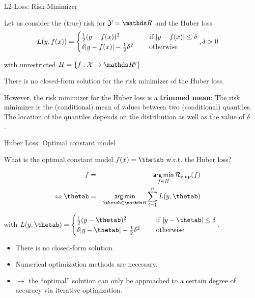 \begin{vbframe}{L2-Loss: Risk Minimizer}

Let us consider the (true) risk for  $\Yspace = \R$ and the Huber loss
$$
L(y, f(x)) = \begin{cases}
  \frac{1}{2}(y - f(x))^2  & \text{ if } |y - f(x)| \le \delta \\
  \delta |y - f(x)|-\frac{1}{2}\delta^2 \quad & \text{ otherwise }
  \end{cases}, \delta > 0
$$

 with unrestricted $\Hspace = \{f: \Xspace \to \R^g\}$. 

\lz 

There is no closed-form solution for the risk minimizer of the Huber loss. 

\lz 


However, the risk minimizer for the Huber loss is a \textbf{trimmed mean}: The risk minimizer is the (conditional) mean of values between two (conditional) quantiles. The location of the quantiles depends on the distribution as well as the value of $\delta$. 

\end{vbframe}


\begin{vbframe}{Huber Loss: Optimal constant model}

What is the optimal constant model $\fx = \thetab$ w.r.t. the Huber loss?

\vspace{-0.2cm}
\begin{eqnarray*}
f &=& \argmin_{f \in \Hspace} \riskef\\
\Leftrightarrow
\hat \thetab&=& \argmin_{\thetab\in \R} \sumin L(y, \thetab)
\end{eqnarray*}

with $L(y, \thetab) = \begin{cases}
  \frac{1}{2}(y - \thetab)^2  & \text{ if } |y - \thetab| \le \delta \\
  \delta |y - \thetab|-\frac{1}{2}\delta^2 \quad & \text{ otherwise }
  \end{cases}. $

\begin{itemize}
\item There is no closed-form solution.
\item Numerical optimization methods are necessary.
\item $\to$  the \enquote{optimal} solution can only be approached to a certain degree of accuracy via iterative optimization.
\end{itemize}


\end{vbframe}

